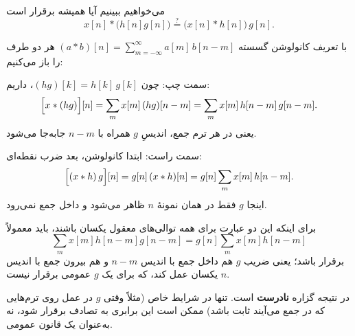می‌خواهیم ببینیم آیا همیشه برقرار است
\[
x[n] * \bigl(h[n] g[n]\bigr)
\stackrel{?}{=}
\bigl(x[n] * h[n]\bigr)\, g[n].
\]

با تعریف کانولوشن گسسته
\(
(a*b)[n]=\sum_{m=-\infty}^{\infty} a[m]\,b[n-m]
\)
هر دو طرف را باز می‌کنیم:

سمت چپ:
چون \((h g)[k]=h[k]\,g[k]\)، داریم:
\[
\Bigl[x * (h g)\Bigr][n]
=
\sum_{m} x[m]\,(h g)[n-m]
=
\sum_{m} x[m]\,h[n-m]\,g[n-m].
\]
یعنی در هر ترم جمع، اندیسِ \(g\) همراه با \(n-m\) جابه‌جا می‌شود.

سمت راست:
ابتدا کانولوشن، بعد ضرب نقطه‌ای:
\[
\Bigl[(x * h)\,g\Bigr][n]
=
g[n]\,(x*h)[n]
=
g[n]\sum_{m} x[m]\,h[n-m].
\]
اینجا \(g\) فقط در همان نمونهٔ \(n\) ظاهر می‌شود و داخل جمع نمی‌رود.

برای اینکه این دو عبارت برای همه توالی‌های معقول یکسان باشند، باید معمولاً
\[
\sum_{m} x[m] h[n-m] g[n-m]
=
g[n]\sum_{m} x[m] h[n-m]
\]
برقرار باشد؛ یعنی ضریب \(g\) هم داخل جمع با اندیس \(n-m\) و هم بیرون جمع با اندیس \(n\) یکسان عمل کند، که برای یک \(g\) عمومی برقرار نیست. 

در نتیجه گزاره \textbf{نادرست} است. تنها در شرایط خاص (مثلاً وقتی \(g\) در عمل روی ترم‌هایی که در جمع می‌آیند ثابت باشد) ممکن است این برابری به تصادف برقرار شود، نه به‌عنوان یک قانون عمومی.
